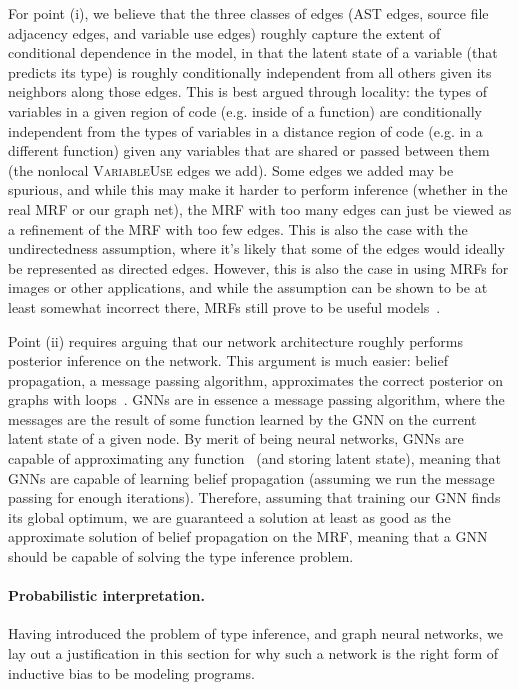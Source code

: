 For point (i), we believe that the three classes of edges (AST edges, source file adjacency edges, and variable use edges) roughly capture the extent of conditional dependence in the model, in that the latent state of a variable (that predicts its type) is roughly conditionally independent from all others given its neighbors along those edges.
This is best argued through locality: the types of variables in a given region of code (e.g. inside of a function) are conditionally independent from the types of variables in a distance region of code (e.g. in a different function) given any variables that are shared or passed between them (the nonlocal \textsc{VariableUse} edges we add).
Some edges we added may be spurious, and while this may make it harder to perform inference (whether in the real MRF or our graph net), the MRF with too many edges can just be viewed as a refinement of the MRF with too few edges.
This is also the case with the undirectedness assumption, where it's likely that some of the edges would ideally be represented as directed edges.
However, this is also the case in using MRFs for images or other applications, and while the assumption can be shown to be at least somewhat incorrect there, MRFs still prove to be useful models~\cite{rangarajan95markov}.

Point (ii) requires arguing that our network architecture roughly performs posterior inference on the network.
This argument is much easier: belief propagation, a message passing algorithm, approximates the correct posterior on graphs with loops~\cite{weiss2000correctness}.
GNNs are in essence a message passing algorithm, where the messages are the result of some function learned by the GNN on the current latent state of a given node.
By merit of being neural networks, GNNs are capable of approximating any function~\cite{hornik1989multilayer} (and storing latent state), meaning that GNNs are capable of learning belief propagation (assuming we run the message passing for enough iterations).
Therefore, assuming that training our GNN finds its global optimum, we are guaranteed a solution at least as good as the approximate solution of belief propagation on the MRF, meaning that a GNN should be capable of solving the type inference problem.

\paragraph{Probabilistic interpretation.}
Having introduced the problem of type inference, and graph neural networks, we lay out a justification in this section for why such a network is the right form of inductive bias to be modeling programs.

